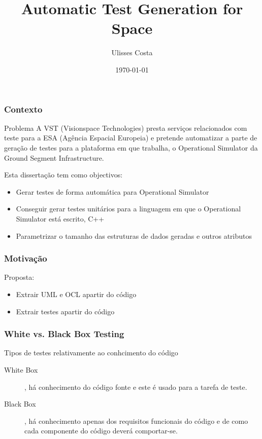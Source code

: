 \documentclass{beamer}
\title{Automatic Test Generation for Space}
\author{Ulisses Costa}
\date{\today}
\begin{document}
\begin{frame}
   \titlepage
\end{frame}

\begin{frame}\frametitle{Contexto}
\begin{block}{Problema}
A VST (Visionspace Technologies) presta serviços relacionados com teste para a ESA (Agência Espacial Europeia) e pretende automatizar
a parte de geração de testes para a plataforma em que trabalha, o Operational Simulator da Ground Segment Infrastructure.
\end{block}{}

Esta dissertação tem como objectivos:
\begin{itemize}
\item Gerar testes de forma automática para Operational Simulator
\item Conseguir gerar testes unitários para a linguagem em que o Operational Simulator está escrito, C++
\item Parametrizar o tamanho das estruturas de dados geradas e outros atributos
\end{itemize}
\end{frame}

\begin{frame}\frametitle{Motivação}
Proposta:
\begin{itemize}
\item Extrair UML e OCL apartir do código
\item Extrair testes apartir do código
\end{itemize}
\end{frame}

\begin{frame}\frametitle{White vs. Black Box Testing}
\begin{block}{Tipos de testes relativamente ao conhcimento do código}
\begin{description}
\item[White Box], há conhecimento do código fonte e este é usado para a tarefa de teste.
\item[Black Box], há conhecimento apenas dos requisitos funcionais do código e de como cada componente do código deverá comportar-se.
\end{description}
\end{block}
\end{frame}
\end{document}
